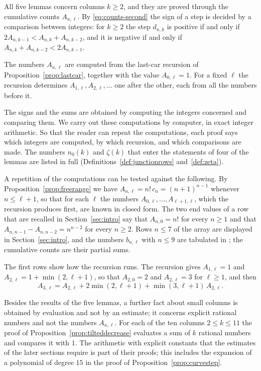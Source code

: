 \documentclass{amsart}
\makeatletter
\theoremstyle{definition}
\theoremstyle{remark}
\numberwithin{equation}{section}
\def\subsection{\@startsection{subsection}{2}\z@{.5\linespacing\@plus.7\linespacing}{-.5em}{\normalfont\bfseries\boldmath}}
\makeatother
\begin{document}
\subsection{The integers that are computed}\label{subsec:tables-integers}

All five lemmas concern columns $k\ge2$, and they are proved through the
cumulative counts $A_{n,\ell}$. By \eqref{eq:counts-second} the sign
of a step is decided by a comparison between integers: for $k\ge2$ the step
$d_{n,k}$ is positive if and only if $2A_{n,k-1}<A_{n,k}+A_{n,k-2}$, and it
is negative if and only if $A_{n,k}+A_{n,k-2}<2A_{n,k-1}$.

The numbers $A_{n,\ell}$ are computed from the last-car recursion of
Proposition~\ref{prop:lastcar}, together with the value $A_{0,\ell}=1$. For
a fixed $\ell$ the recursion determines $A_{1,\ell},A_{2,\ell},\dots$ one
after the other, each from all the numbers before it.

The signs and the sums are obtained by computing the integers concerned and
comparing them. We carry out these computations by computer, in exact
integer arithmetic. So that the
reader can repeat the computations, each proof says which integers are
computed, by which recursion, and which comparisons are made. The
numbers $n_0(k)$ and $\zeta(k)$ that enter the statements of four of the
lemmas are listed in full (Definitions~\ref{def:junctionrows}
and~\ref{def:zeta}).

A repetition of the computations can be tested against the following. By
Proposition~\ref{prop:freerange} we have $A_{n,\ell}=n!\,c_n=(n+1)^{n-1}$
whenever $n\le\ell+1$, so that for each $\ell$ the numbers
$A_{0,\ell},\dots,A_{\ell+1,\ell}$, which the recursion produces first, are
known in closed form. The two end values of a row that are recalled in
Section~\ref{sec:intro} say that $A_{n,0}=n!$ for every $n\ge1$ and that
$A_{n,n-1}-A_{n,n-2}=n^{n-2}$ for every $n\ge2$. Rows $n\le7$ of the array
are displayed in Section~\ref{sec:intro}, and the numbers $b_{n,\ell}$ with
$n\le9$ are tabulated in \cite[Table~1]{celano2025}; the cumulative counts
are their partial sums.

The first rows show how the recursion runs. The
recursion gives $A_{1,\ell}=1$ and $A_{2,\ell}=1+\min(2,\ell+1)$, so that
$A_{2,0}=2$ and $A_{2,\ell}=3$ for $\ell\ge1$, and then
\[
A_{3,\ell}=A_{2,\ell}+2\min(2,\ell+1)+\min(3,\ell+1)\,A_{2,\ell}.
\]

Besides the results of the five lemmas, a further fact about small columns
is obtained by evaluation and not by
an estimate; it concerns explicit rational numbers and not the numbers
$A_{n,\ell}$. For each of the ten columns $2\le k\le11$ the proof of
Proposition~\ref{prop:tilteddecrease} evaluates a sum of $k$ rational
numbers and compares it with $1$. The arithmetic with explicit constants that the
estimates of the later sections require is part of their proofs; this
includes the expansion of a polynomial of degree $15$ in the proof of
Proposition~\ref{prop:curvestep}.
\end{document}
